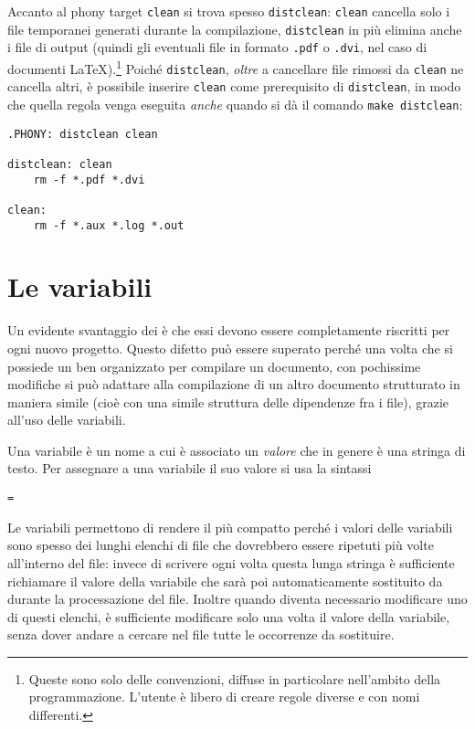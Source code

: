 Accanto al phony target \texttt{clean} si trova spesso \texttt{distclean}:
\texttt{clean} cancella solo i file temporanei generati durante la compilazione,
\texttt{distclean} in più elimina anche i file di output (quindi gli eventuali
file in formato \texttt{.pdf} o \texttt{.dvi}, nel caso di documenti
\LaTeX).\footnote{Queste sono solo delle convenzioni, diffuse in particolare
  nell'ambito della programmazione.  L'utente è libero di creare regole diverse
  e con nomi differenti.}
Poiché \texttt{distclean}, \emph{oltre} a cancellare file rimossi da
\texttt{clean} ne cancella altri, è possibile inserire \texttt{clean} come
prerequisito di \texttt{distclean}, in modo che quella regola venga eseguita
\emph{anche} quando si dà il comando \texttt{make distclean}:
\begin{lstlisting}[caption={Phony targets \texttt{distclean} e \texttt{clean}.},
label=lst:distclean]
.PHONY: distclean clean

distclean: clean
	rm -f *.pdf *.dvi

clean:
	rm -f *.aux *.log *.out
\end{lstlisting}


\section{Le variabili}
\label{sec:variabili}

Un evidente svantaggio dei  è che essi devono essere
completamente riscritti per ogni nuovo progetto.  Questo difetto può essere
superato perché una volta che si possiede un  ben
organizzato per compilare un documento, con pochissime modifiche si può adattare
alla compilazione di un altro documento strutturato in maniera simile (cioè con
una simile struttura delle dipendenze fra i file), grazie all'uso delle
variabili.

Una variabile è un nome a cui è associato un \emph{valore} che in genere è una
stringa di testo.  Per assegnare a una variabile il suo valore si usa la
sintassi
\begin{sintassi}
  \small {} \texttt{=} 
\end{sintassi}
Le variabili permettono di rendere il  più compatto perché i
valori delle variabili sono spesso dei lunghi elenchi di file che dovrebbero
essere ripetuti più volte all'interno del file: invece di scrivere ogni volta
questa lunga stringa è sufficiente richiamare il valore della variabile che sarà
poi automaticamente sostituito da  durante la processazione del
file.  Inoltre quando diventa necessario modificare uno di questi elenchi, è
sufficiente modificare solo una volta il valore della variabile, senza dover
andare a cercare nel file tutte le occorrenze da sostituire.

